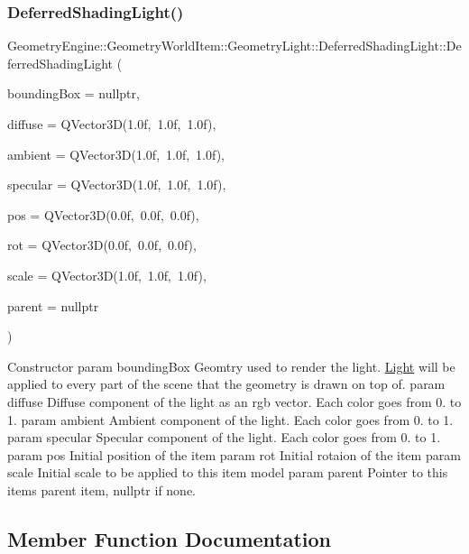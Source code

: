 \subsubsection{\texorpdfstring{DeferredShadingLight()}{DeferredShadingLight()}}
{\footnotesize\ttfamily Geometry\+Engine\+::\+Geometry\+World\+Item\+::\+Geometry\+Light\+::\+Deferred\+Shading\+Light\+::\+Deferred\+Shading\+Light (\begin{DoxyParamCaption}\item[{\mbox{\hyperlink{class_geometry_engine_1_1_geometry_world_item_1_1_geometry_item_1_1_geometry_item}{Geometry\+Item\+::\+Geometry\+Item}} $\ast$}]{bounding\+Box = {\ttfamily nullptr},  }\item[{const Q\+Vector3D \&}]{diffuse = {\ttfamily QVector3D(1.0f,~1.0f,~1.0f)},  }\item[{const Q\+Vector3D \&}]{ambient = {\ttfamily QVector3D(1.0f,~1.0f,~1.0f)},  }\item[{const Q\+Vector3D \&}]{specular = {\ttfamily QVector3D(1.0f,~1.0f,~1.0f)},  }\item[{const Q\+Vector3D \&}]{pos = {\ttfamily QVector3D(0.0f,~0.0f,~0.0f)},  }\item[{const Q\+Vector3D \&}]{rot = {\ttfamily QVector3D(0.0f,~0.0f,~0.0f)},  }\item[{const Q\+Vector3D \&}]{scale = {\ttfamily QVector3D(1.0f,~1.0f,~1.0f)},  }\item[{\mbox{\hyperlink{class_geometry_engine_1_1_geometry_world_item_1_1_world_item}{World\+Item}} $\ast$}]{parent = {\ttfamily nullptr} }\end{DoxyParamCaption})}

Constructor param bounding\+Box Geomtry used to render the light. \mbox{\hyperlink{class_geometry_engine_1_1_geometry_world_item_1_1_geometry_light_1_1_light}{Light}} will be applied to every part of the scene that the geometry is drawn on top of. param diffuse Diffuse component of the light as an rgb vector. Each color goes from 0. to 1. param ambient Ambient component of the light. Each color goes from 0. to 1. param specular Specular component of the light. Each color goes from 0. to 1. param pos Initial position of the item param rot Initial rotaion of the item param scale Initial scale to be applied to this item model param parent Pointer to this items parent item, nullptr if none. 

\subsection{Member Function Documentation}
\mbox{\label{class_geometry_engine_1_1_geometry_world_item_1_1_geometry_light_1_1_deferred_shading_light_a742416954d3b05484799e4c1235567b1}} 
